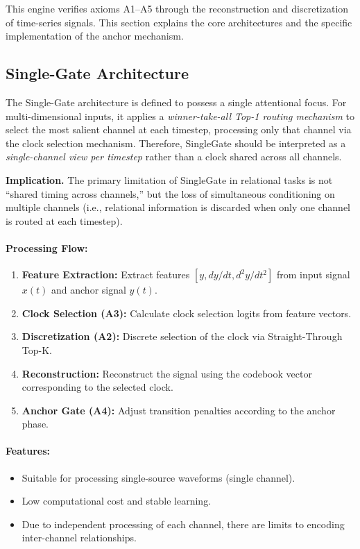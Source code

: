 \documentclass{article}
\begin{document}
This engine verifies axioms A1–A5 through the reconstruction and discretization of time-series signals. This section explains the core architectures and the specific implementation of the anchor mechanism.

\subsection{Single-Gate Architecture}
The Single-Gate architecture is defined to possess a single attentional focus. For multi-dimensional inputs, it applies a \emph{winner-take-all Top-1 routing mechanism} to select the most salient channel at each timestep, processing only that channel via the clock selection mechanism. Therefore, SingleGate should be interpreted as a \emph{single-channel view per timestep} rather than a clock shared across all channels.

\noindent\textbf{Implication.} The primary limitation of SingleGate in relational tasks is not ``shared timing across channels,'' but the loss of simultaneous conditioning on multiple channels (i.e., relational information is discarded when only one channel is routed at each timestep).

\paragraph{Processing Flow:}
\begin{enumerate}
    \item \textbf{Feature Extraction:} Extract features $[y, dy/dt, d^2y/dt^2]$ from input signal $x(t)$ and anchor signal $y(t)$.
    \item \textbf{Clock Selection (A3):} Calculate clock selection logits from feature vectors.
    \item \textbf{Discretization (A2):} Discrete selection of the clock via Straight-Through Top-K.
    \item \textbf{Reconstruction:} Reconstruct the signal using the codebook vector corresponding to the selected clock.
    \item \textbf{Anchor Gate (A4):} Adjust transition penalties according to the anchor phase.
\end{enumerate}

\paragraph{Features:}
\begin{itemize}
    \item Suitable for processing single-source waveforms (single channel).
    \item Low computational cost and stable learning.
    \item Due to independent processing of each channel, there are limits to encoding inter-channel relationships.
\end{itemize}
\end{document}
